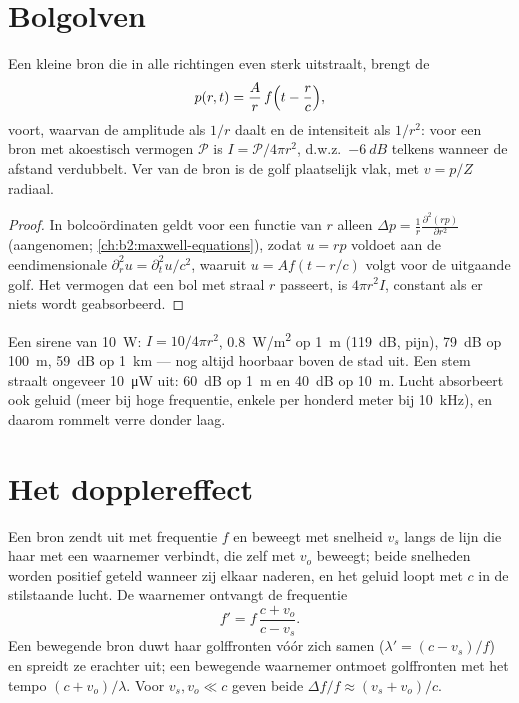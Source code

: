 \section{Bolgolven}

\begin{proposition}\label{prop:b2:sound-waves:spherical}
Een kleine bron die in alle richtingen even sterk uitstraalt, brengt de 
\[
p(r, t) = \frac{A}{r}\,f\Bigl(t - \frac rc\Bigr) ,
\]
voort, waarvan de amplitude als $1/r$ daalt en de intensiteit als $1/r^2$:
voor een bron met akoestisch vermogen $\mathcal P$ is
$I = \mathcal P/4\pi r^2$, d.w.z.\ $-\qty{6}{dB}$ telkens wanneer de afstand
verdubbelt. Ver van de bron is de golf plaatselijk vlak, met $v = p/Z$
radiaal.
\end{proposition}

\begin{proof}
In bolcoördinaten geldt voor een functie van $r$ alleen
$\Delta p =
\frac1r\frac{\partial^2(rp)}{\partial r^2}$ (aangenomen;
\cref{ch:b2:maxwell-equations}), zodat $u = rp$ voldoet aan de
eendimensionale  $\partial_r^2u = \partial_t^2u/c^2$,
waaruit $u = Af(t - r/c)$ volgt voor de uitgaande golf. Het vermogen dat een
bol met straal $r$ passeert, is $4\pi r^2I$, constant als er niets wordt
geabsorbeerd.
\end{proof}

\begin{example}\label{ex:b2:sound-waves:siren}
Een sirene van \qty{10}{W}: $I = 10/4\pi r^2$, \qty{0.8}{W/m^2} op
\qty{1}{m} (\qty{119}{dB}, pijn), \qty{79}{dB} op \qty{100}{m}, \qty{59}{dB}
op \qty{1}{km} --- nog altijd hoorbaar boven de stad uit. Een stem straalt
ongeveer \qty{10}{\micro W} uit: \qty{60}{dB} op \qty{1}{m} en \qty{40}{dB}
op \qty{10}{m}. Lucht absorbeert ook geluid (meer bij hoge frequentie,
enkele  per honderd meter bij \qty{10}{kHz}), en daarom rommelt verre
donder laag.
\end{example}

\section{Het dopplereffect}

\begin{theorem}[Dopplereffect]\label{thm:b2:sound-waves:doppler}
Een bron zendt uit met frequentie $f$ en beweegt met snelheid $v_s$ langs de
lijn die haar met een waarnemer verbindt, die zelf met $v_o$ beweegt; beide
snelheden worden positief geteld wanneer zij elkaar naderen, en het geluid
loopt met $c$ in de stilstaande lucht. De waarnemer ontvangt de frequentie
\[
f' = f\,\frac{c + v_o}{c - v_s} .
\]
Een bewegende bron duwt haar golffronten vóór zich samen
($\lambda' = (c - v_s)/f$) en spreidt ze erachter uit; een bewegende
waarnemer ontmoet golffronten met het tempo $(c + v_o)/\lambda$. Voor
$v_s, v_o \ll c$ geven beide $\Delta f/f \approx
(v_s + v_o)/c$.
\end{theorem}

